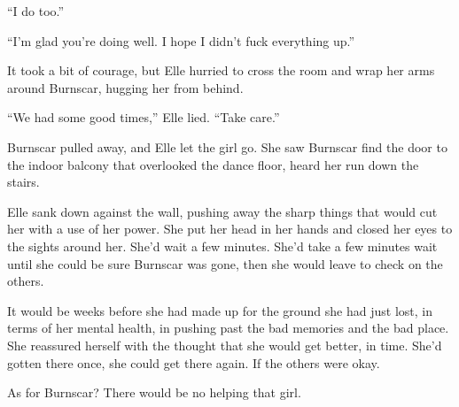 ``I do too.''



``I'm glad you're doing well.  I hope I didn't fuck everything up.''



It took a bit of courage, but Elle hurried to cross the room and wrap her arms around Burnscar, hugging her from behind.



``We had some good times,'' Elle lied.  ``Take care.''



Burnscar pulled away, and Elle let the girl go.  She saw Burnscar find the door to the indoor balcony that overlooked the dance floor, heard her run down the stairs.



Elle sank down against the wall, pushing away the sharp things that would cut her with a use of her power.  She put her head in her hands and closed her eyes to the sights around her.  She'd wait a few minutes.  She'd take a few minutes wait until she could be sure Burnscar was gone, then she would leave to check on the others.



It would be weeks before she had made up for the ground she had just lost, in terms of her mental health, in pushing past the bad memories and the bad place.  She reassured herself with the thought that she would get better, in time.  She'd gotten there once, she could get there again.  If the others were okay.



As for Burnscar?  There would be no helping that girl.





